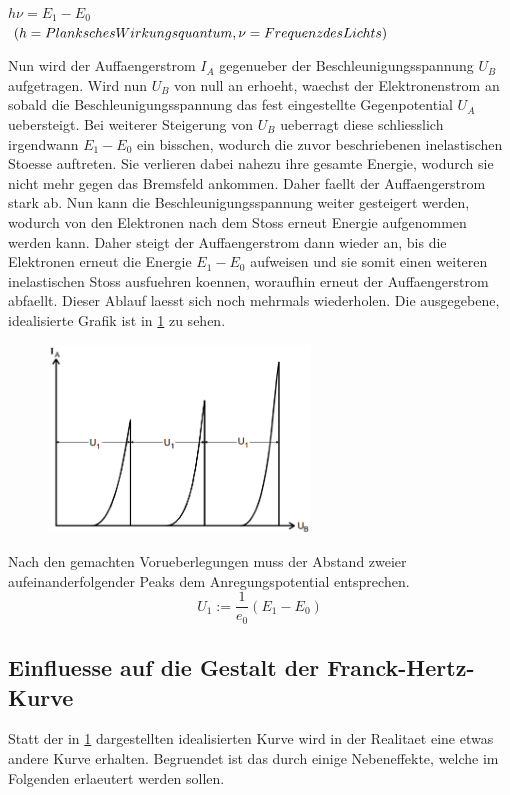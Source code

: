 \documentclass[titlepage=firstcover, captions=tableheading]{scrartcl}
\begin{document}
   \begin{center}
    $h\nu=E_1-E_0 \nonumber$\\
    $(h=Planksches \space Wirkungsquantum, \nu=Frequenz \space des \space Lichts)\nonumber$
   \end{center}
Nun wird der Auffaengerstrom $I_A$ gegenueber der Beschleunigungsspannung $U_B$ aufgetragen. Wird nun $U_B$ von null an erhoeht, waechst der Elektronenstrom an sobald die Beschleunigungsspannung das fest eingestellte Gegenpotential $U_A$ uebersteigt. Bei weiterer Steigerung von $U_B$ ueberragt diese schliesslich irgendwann $E_1-E_0$ ein bisschen, wodurch die zuvor beschriebenen inelastischen Stoesse auftreten. Sie verlieren dabei nahezu ihre gesamte Energie, wodurch sie nicht mehr gegen das Bremsfeld ankommen. Daher faellt der Auffaengerstrom stark ab. Nun kann die Beschleunigungsspannung weiter gesteigert werden, wodurch von den Elektronen nach dem Stoss erneut Energie aufgenommen werden kann. Daher steigt der Auffaengerstrom dann wieder an, bis die Elektronen erneut die Energie $E_1-E_0$ aufweisen und sie somit einen weiteren inelastischen Stoss ausfuehren koennen, woraufhin erneut der Auffaengerstrom abfaellt. Dieser Ablauf laesst sich noch mehrmals wiederholen. Die ausgegebene, idealisierte Grafik ist in \ref{Fig:Ideal} zu sehen.
\begin{figure}[H]
    \centering
    \captionsetup{justification=centering}
    \includegraphics[height=5cm]{"Ideal_FranckHertz.png"}
    \label{Fig:Ideal}
\end{figure}
Nach den gemachten Vorueberlegungen muss der Abstand zweier aufeinanderfolgender Peaks dem Anregungspotential entsprechen.
\begin{equation}
    U_1:=\frac{1}{e_0}(E_1-E_0)
\end{equation}
\subsection{Einfluesse auf die Gestalt der Franck-Hertz-Kurve}
Statt der in \ref{Fig:Ideal} dargestellten idealisierten Kurve wird in der Realitaet eine etwas andere Kurve erhalten. Begruendet ist das durch einige Nebeneffekte, welche im Folgenden erlaeutert werden sollen.
\end{document}
